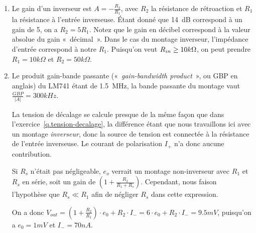 \documentclass{../../template/tp}
\begin{document}
{
    \begin{enumerate}
        \item Le gain d'un inverseur est $A = -\frac{R_2}{R_1}$, avec $R_2$ la résistance de rétroaction et $R_1$ la résistance à l'entrée inverseuse.
        Étant donné que 14~dB correspond à un gain de 5, on a $R_2 = 5 R_1$. Notez que le gain en décibel correspond à la valeur absolue du gain «~décimal~».
        Dans le cas du montage inverseur, l'impédance d'entrée correspond à notre $R_1$.
        Puisqu'on veut $R_{in} \geq 10 k\ohm$, on peut prendre $R_1 = 10 k\Omega$ et $R_2 = 50 k\Omega$.

        \item Le produit gain-bande passante («~\textit{gain-bandwidth product}~», ou GBP en anglais) du LM741 étant de 1.5~MHz, la bande passante du montage vaut $\frac{GBP}{|A|} = 300 kHz$.

        La tension de décalage se calcule presque de la même façon que dans l'exercice~\ref{q.tension-decalage}, la différence étant que nous travaillons ici avec un montage \textit{inverseur}, donc la source de tension est connectée à la résistance de l'entrée inverseuse. Le courant de polarisation $I_+$ n'a donc aucune contribution.

        Si $R_s$ n'était pas négligeable, $e_o$ verrait un montage non-inverseur avec $R_1$ et $R_s$ en série, soit un gain de $\left( 1 + \frac{R_2}{R_1 + R_s} \right)$. Cependant, nous faison l'hypothèse que $R_s \ll R_1$ afin de négliger $R_s$ dans cette expression.

        On a donc $V_{out} = \left(1+\frac{R_2}{R_1}\right)\cdot e_0 + R_2 \cdot I_- = 6\cdot e_0 + R_2 \cdot I_- = 9.5 mV$, puisqu'on a $e_0 = 1mV$ et $I_- = 70nA$.
    \end{enumerate}
}
\end{document}
